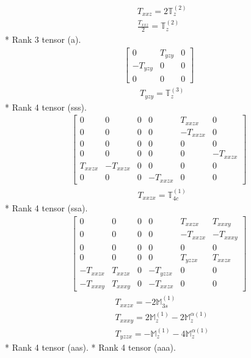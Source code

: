 \documentclass[fleqn,8pt,landscape]{jsarticle}
\begin{document}
\begin{align*}
& T_{xxz} = 2 \mathbb{T}_{z}^{(2)} \\
& \frac{T_{xxz}}{2} = \mathbb{T}_{z}^{(2)}
\end{align*}
* Rank 3 tensor (a).
\begin{align*}
\begin{bmatrix} 0 & T_{yzy} & 0 \\ - T_{yzy} & 0 & 0 \\ 0 & 0 & 0 \end{bmatrix}
\end{align*}
\begin{align*}
& T_{yzy} = \mathbb{T}_{z}^{(3)}
\end{align*}
* Rank 4 tensor (sss).
\begin{align*}
\begin{bmatrix} 0 & 0 & 0 & 0 & T_{xxzx} & 0 \\ 0 & 0 & 0 & 0 & - T_{xxzx} & 0 \\ 0 & 0 & 0 & 0 & 0 & 0 \\ 0 & 0 & 0 & 0 & 0 & - T_{xxzx} \\ T_{xxzx} & - T_{xxzx} & 0 & 0 & 0 & 0 \\ 0 & 0 & 0 & - T_{xxzx} & 0 & 0 \end{bmatrix}
\end{align*}
\begin{align*}
& T_{xxzx} = \mathbb{T}_{4c}^{(1)}
\end{align*}
* Rank 4 tensor (ssa).
\begin{align*}
\begin{bmatrix} 0 & 0 & 0 & 0 & T_{xxzx} & T_{xxxy} \\ 0 & 0 & 0 & 0 & - T_{xxzx} & - T_{xxxy} \\ 0 & 0 & 0 & 0 & 0 & 0 \\ 0 & 0 & 0 & 0 & T_{yzzx} & T_{xxzx} \\ - T_{xxzx} & T_{xxzx} & 0 & - T_{yzzx} & 0 & 0 \\ - T_{xxxy} & T_{xxxy} & 0 & - T_{xxzx} & 0 & 0 \end{bmatrix}
\end{align*}
\begin{align*}
& T_{xxzx} = - 2 \mathbb{M}_{3s}^{(1)} \\
& T_{xxxy} = 2 \mathbb{M}_{z}^{(1)} - 2 \mathbb{M}_{z}^{\alpha(1)} \\
& T_{yzzx} = - \mathbb{M}_{z}^{(1)} - 4 \mathbb{M}_{z}^{\alpha(1)}
\end{align*}
* Rank 4 tensor (aas).
* Rank 4 tensor (aaa).
\end{document}
